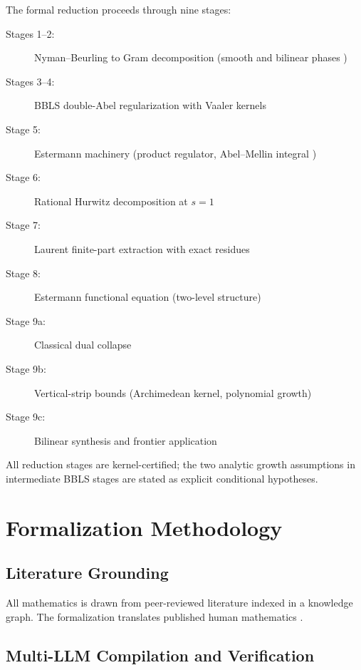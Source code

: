 \documentclass[11pt,a4paper]{article}
\theoremstyle{plain}
\theoremstyle{definition}
\theoremstyle{remark}
\begin{document}
The formal reduction proceeds through nine stages:

\begin{description}
  \item[Stages 1--2:] Nyman--Beurling to Gram decomposition (smooth and bilinear phases \cite{Vasyunin1995})
  \item[Stages 3--4:] BBLS double-Abel regularization with Vaaler kernels
  \item[Stage 5:] Estermann machinery (product regulator, Abel--Mellin integral \cite{Estermann1928})
  \item[Stage 6:] Rational Hurwitz decomposition at $s=1$
  \item[Stage 7:] Laurent finite-part extraction with exact residues
  \item[Stage 8:] Estermann functional equation (two-level structure)
  \item[Stage 9a:] Classical dual collapse
  \item[Stage 9b:] Vertical-strip bounds (Archimedean kernel, polynomial growth)
  \item[Stage 9c:] Bilinear synthesis and frontier application
\end{description}

All reduction stages are kernel-certified; the two analytic growth assumptions in intermediate BBLS stages are stated as explicit conditional hypotheses.

\section{Formalization Methodology}
\label{sec:methodology}

\subsection{Literature Grounding}

All mathematics is drawn from peer-reviewed literature indexed in a knowledge graph. The formalization translates published human mathematics \cite{Nyman1950,Beurling1955,BaezDuarte2003,Estermann1928,Vasyunin1995}.

\subsection{Multi-LLM Compilation and Verification}
\end{document}
